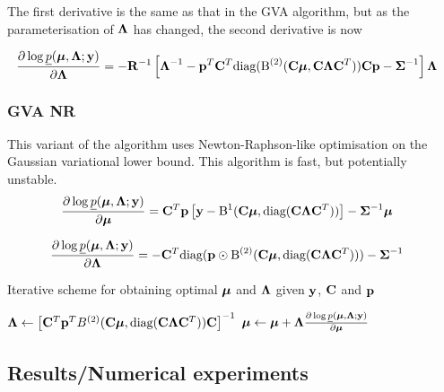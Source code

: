 \documentclass{article}[12pt]
\begin{document}
\noindent The first derivative is the same as that in the GVA algorithm, but as the 
parameterisation of ${\boldsymbol \Lambda}$ has changed, the second derivative is now

\begin{align*}
\frac{\partial \log \underline{p}({\boldsymbol \mu}, {\boldsymbol \Lambda}; {\bf y})}{\partial {\boldsymbol\Lambda}} &= -{\bf R}^{-1}\left [{\boldsymbol \Lambda}^{-1} - {\bf p}^T {\bf C}^T \text{diag}({\text{B}}^{(2)}({\bf C} {\boldsymbol \mu}, {\bf C} {\boldsymbol \Lambda} {\bf C}^T)) {\bf C} {\bf p} - {\boldsymbol \Sigma}^{-1} \right ]{\boldsymbol\Lambda}
\end{align*} 

\subsubsection{GVA NR}
This variant of the algorithm uses Newton-Raphson-like optimisation on the Gaussian
variational lower bound. This algorithm is fast, but potentially unstable.
\begin{align*}
\frac{\partial \log \underline{p}({\boldsymbol \mu}, {\boldsymbol \Lambda}; {\bf y})}{\partial {\boldsymbol\mu}} &= {\bf C}^T{\bf p} \left [{\bf y} - {\text{B}}^{1}({\bf C} {\boldsymbol \mu}, \text{diag}({\bf C} {\boldsymbol \Lambda} {\bf C}^T)) \right ] - {\boldsymbol \Sigma}^{-1} {\boldsymbol \mu}
\end{align*}

\begin{align*}
\frac{\partial \log \underline{p}({\boldsymbol \mu}, {\boldsymbol \Lambda}; {\bf y})}{\partial {\boldsymbol\Lambda}} &= -{\bf C}^T \text{diag}({\bf p} \odot {\text{B}}^{(2)}({\bf C} {\boldsymbol \mu}, \text{diag}({\bf C} {\boldsymbol \Lambda} {\bf C}^T))) - {\boldsymbol \Sigma}^{-1}
\end{align*}

\begin{algorithm}\label{alg:algorithm_nr}
\label{algorithm_nr}
\caption[Algorithm GVA NR]{Iterative scheme for obtaining optimal ${\boldsymbol \mu}$ and ${\boldsymbol \Lambda}$
given ${\bf y}$, ${\bf C}$ and ${\bf p}$}
\begin{algorithmic}
\STATE ${\boldsymbol \Lambda} \leftarrow \left [ {\bf C}^T{\bf p}^T B^{(2)}({\bf C} {\boldsymbol \mu}, \text{diag}({\bf C} {\boldsymbol \Lambda} {\bf C}^T)) {\bf C} \right ]^{-1}$
\STATE ${\boldsymbol \mu} \leftarrow {\boldsymbol\mu} + {\boldsymbol \Lambda} \frac{\partial \log \underline{p}({\boldsymbol \mu}, {\boldsymbol \Lambda}; {\bf y})}{\partial {\boldsymbol\mu}}$
\ENDWHILE
\end{algorithmic}
\end{algorithm}


\subsection{Results/Numerical experiments}\label{sec:results}
\end{document}
